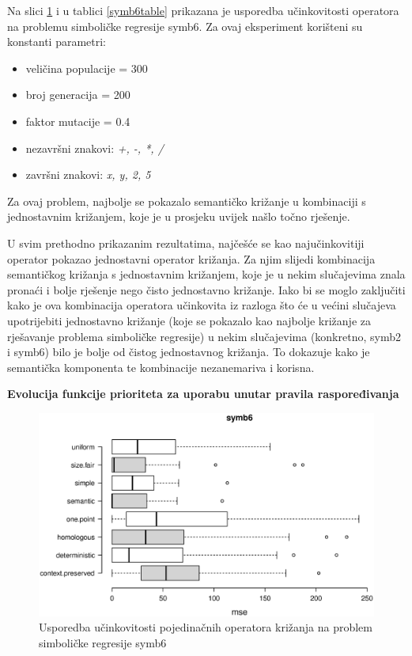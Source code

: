 Na slici \ref{symb6box} i u tablici \ref{symb6table} prikazana je usporedba učinkovitosti operatora na problemu simboličke regresije symb6. Za ovaj eksperiment korišteni su konstanti parametri:
\begin{itemize}
\item{veličina populacije = 300}
\item{broj generacija = 200}
\item{faktor mutacije = 0.4}
\item{nezavršni znakovi: \textit{ +, -, *, /}}
\item{završni znakovi: \textit{x, y, 2, 5}}
\end{itemize} 

Za ovaj problem, najbolje se pokazalo semantičko križanje u kombinaciji s jednostavnim križanjem, koje je u prosjeku uvijek našlo točno rješenje.


U svim prethodno prikazanim rezultatima, najčešće se kao najučinkovitiji operator pokazao jednostavni operator križanja. Za njim slijedi kombinacija semantičkog križanja s jednostavnim križanjem, koje je u nekim slučajevima znala pronaći i bolje rješenje nego čisto jednostavno križanje. Iako bi se moglo zaključiti kako je ova kombinacija operatora učinkovita iz razloga što će u većini slučajeva upotrijebiti jednostavno križanje (koje se pokazalo kao najbolje križanje za rješavanje problema simboličke regresije) u nekim slučajevima (konkretno, symb2 i symb6) bilo je bolje od čistog jednostavnog križanja. To dokazuje kako je semantička komponenta te kombinacije nezanemariva i korisna.



\textbf{Evolucija funkcije prioriteta za uporabu unutar pravila raspoređivanja}


\begin{figure}[H]
	\centering
	\includegraphics[trim=0cm 4cm 0cm 0cm, scale=0.6]{./slike/boxPlots/symb6.eps}
	\caption{Usporedba učinkovitosti pojedinačnih operatora križanja na problem simboličke regresije symb6}
	\label{symb6box}
\end{figure}


